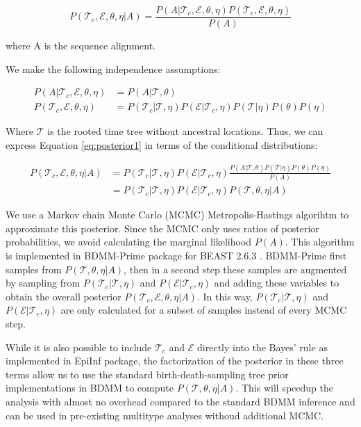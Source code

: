 \begin{equation}
P(\mathcal{T}_c, \mathcal{E}, \theta, \eta | A ) = \frac{P(A | \mathcal{T}_c, \mathcal{E}, \theta, \eta ) P(\mathcal{T}_c, \mathcal{E}, \theta, \eta)}{P(A)}
\label{eq:posterior1}
\end{equation}

where A is the sequence alignment.

We make the following independence assumptions:

\begin{align}
P(A | \mathcal{T}_c, \mathcal{E}, \theta, \eta ) &= P(A | \mathcal{T},\theta )\\
P(\mathcal{T}_c, \mathcal{E}, \theta, \eta) &= P(\mathcal{T}_c|\mathcal{T}, \eta) P(\mathcal{E}|\mathcal{T}_c, \eta) P(\mathcal{T} | \eta ) P(\theta) P(\eta)
\label{eq:assumptions}
\end{align}


Where $\mathcal{T}$ is the rooted time tree without ancestral locations. Thus, we can express Equation \ref{eq:posterior1} in terms of the conditional distributions:

\begin{align}
P(\mathcal{T}_c, \mathcal{E}, \theta, \eta | A) &= P(\mathcal{T}_c|\mathcal{T}, \eta) P(\mathcal{E}|\mathcal{T}_c, \eta) \frac{P(A | \mathcal{T}, \theta) P(\mathcal{T} | \eta) P(\theta) P(\eta)}{P(A)}\\
&= P(\mathcal{T}_c|\mathcal{T}, \eta) P(\mathcal{E}|\mathcal{T}_c, \eta) P(\mathcal{T}, \theta, \eta | A)
\label{eq:posterior2}
\end{align}

We use a Markov chain Monte Carlo (MCMC) Metropolis-Hastings algorihtm to approximate this posterior. Since the MCMC only uses ratios of posterior probabilities, we avoid calculating the marginal likelihood $P(A)$. This algorithm is implemented in BDMM-Prime package \cite{bdmmp} for BEAST 2.6.3 \cite{Bouckaert2019}. BDMM-Prime first samples from $P(\mathcal{T}, \theta, \eta | A)$, then in a second step these samples are augmented by sampling from $P(\mathcal{T}_c|\mathcal{T}, \eta)$ and $P(\mathcal{E}|\mathcal{T}_c, \eta) $ and adding these variables to obtain the overall posterior $P(\mathcal{T}_c, \mathcal{E}, \theta, \eta | A)$. In this way, $P(\mathcal{T}_c|\mathcal{T}, \eta)$ and $P(\mathcal{E}|\mathcal{T}_c, \eta) $  are only calculated for a subset of samples instead of every MCMC step.


While it is also possible to include $\mathcal{T}_c$ and $\mathcal{E}$ directly into the Bayes' rule as implemented in EpiInf package\cite{Vaughan2019}, the factorization of the posterior in these three terms allow us to use the standard birth-death-sampling tree prior implementations in BDMM \cite{Kuhnert2016} \cite{Scire2020} to compute $P(\mathcal{T}, \theta, \eta | A)$. This will speedup the analysis with almost no overhead compared to the standard BDMM inference and can be used in pre-existing multitype analyses withoud additional MCMC.\\

